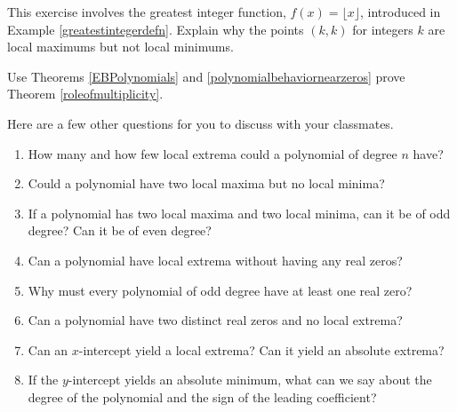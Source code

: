 \documentclass{ximera}
\begin{document}
\begin{problem}
This exercise involves the greatest integer function, $f(x) = \lfloor x \rfloor$,  introduced in Example \ref{greatestintegerdefn}.  Explain why the points $(k,k)$ for integers $k$ are local maximums but not local minimums.
\end{problem}

\begin{problem}
Use Theorems  \ref{EBPolynomials}  and \ref{polynomialbehaviornearzeros} prove Theorem \ref{roleofmultiplicity}.
\end{problem}

\begin{problem}
Here are a few other questions for you to discuss with your classmates.  

\begin{enumerate}

\item How many and how few local extrema could a polynomial of degree $n$ have?  
\item Could a polynomial have two local maxima but no local minima?  
\item If a polynomial has two local maxima and two local minima, can it be of odd degree?  Can it be of even degree?
\item Can a polynomial have local extrema without having any real zeros?
\item Why must every polynomial of odd degree have at least one real zero?
\item Can a polynomial have two distinct real zeros and no local extrema?
\item Can an $x$-intercept yield a local extrema?  Can it yield an absolute extrema?
\item If the $y$-intercept yields an absolute minimum, what can we say about the degree of the polynomial and the sign of the leading coefficient?   

\end{enumerate}
\end{problem}
\end{document}
